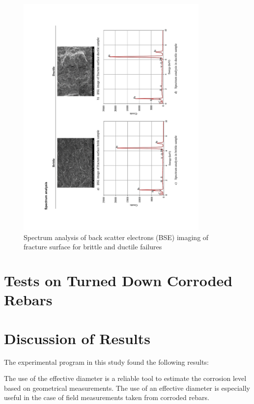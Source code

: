 \begin{figure}[htbp]
	\centering
	\includegraphics[width=0.84\textwidth]{VAC Thesis 2.0/Chapter-4/figs/BBT_SpectrumAnalysis.pdf}
	\caption{Spectrum analysis of back scatter electrons (BSE) imaging of fracture surface for brittle and ductile failures}
	\label{fig:SpectrumAnalysis}
\end{figure}

\newpage

\section{Tests on Turned Down Corroded Rebars}

\section{Discussion of Results}

The experimental program in this study found the following results:

The use of the effective diameter is a reliable tool to estimate the corrosion level based on geometrical measurements. The use of an effective diameter is especially useful in the case of field measurements taken from corroded rebars. 


